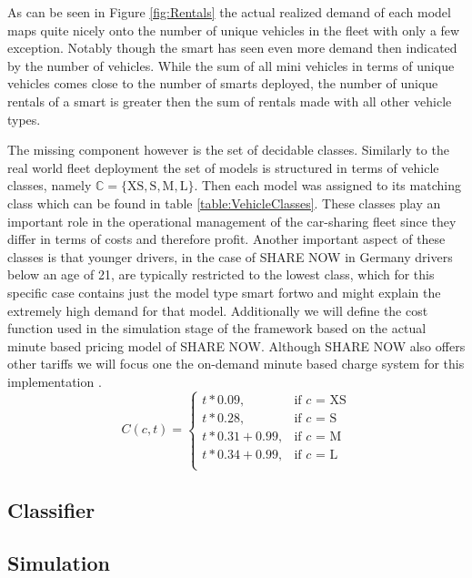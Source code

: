 As can be seen in Figure \ref{fig:Rentals} the actual realized demand of each model maps quite nicely
onto the number of unique vehicles in the fleet with only a few exception. Notably though the smart has
seen even more demand then indicated by the number of vehicles. While the sum of all mini vehicles in terms
of unique vehicles comes close to the number of smarts deployed, the number of unique rentals of a smart
is greater then the sum of rentals made with all other vehicle types.

The missing component however is the set of decidable classes. Similarly to the real world fleet deployment the
set of models is structured in terms of vehicle classes, namely $\mathbb{C} = \{ \text{XS}, \text{S}, \text{M}, \text{L} \}$.
Then each model was assigned to its matching class which can be found in table \ref{table:VehicleClasses}.
These classes play an important role in the operational management of the car-sharing fleet since they differ in terms of costs and therefore profit.
Another important aspect of these classes is that younger drivers, in the case of SHARE NOW in Germany drivers below an age of 21, are typically
restricted to the lowest class, which for this specific case contains just the model type smart fortwo and might explain
the extremely high demand for that model. Additionally we will define the cost function used in the simulation stage
of the framework based on the actual minute based pricing model of SHARE NOW. Although SHARE NOW also offers other tariffs we will focus one
the on-demand minute based charge system for this implementation \cite{ShareNowPricing}.
$$
C(c, t) = \begin{cases}
  t * 0.09, & \text{if $c$ = XS}\\
  t * 0.28, & \text{if $c$ = S}\\
  t * 0.31 + 0.99, & \text{if $c$ = M}\\
  t * 0.34 + 0.99, & \text{if $c$ = L}\\
 \end{cases}
$$


\subsection{Classifier}
\label{sub_sec:CaseStudy/Classifier}


\subsection{Simulation}
\label{sub_sec:CaseStudy/Simulation}